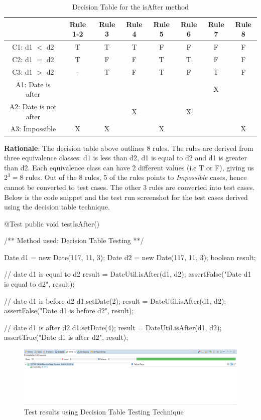 \documentclass[fontsize=12pt,paper=letter,twoside]{scrartcl}
\begin{document}
\begin{table}[h]
\centering
\begin{tabular}{|c | c | c | c | c | c | c | c |}
	\cline{1-8}
	& \textbf{Rule 1-2} & \textbf{Rule 3} & \textbf{Rule 4} & \textbf{Rule 5} & \textbf{Rule 6} & \textbf{Rule 7} & \textbf{Rule 8}\\ \hline
	C1: d1 $<$ d2 & T & T & T & F & F & F & F \\ \hline
	C2: d1 $=$ d2 & T & F & F & T & T & F & F \\ \hline
	C3: d1 $>$ d2 & - & T & F & T & F & T & F \\ \Xhline{2pt}
	A1: Date is after & & & & & & X & \\ \hline
	A2: Date is not after & & & X & & X & & \\ \hline
	A3: Impossible & X & X & & X & & & X \\ \hline
\end{tabular}
\caption {Decision Table for the isAfter method}
\label{tbl:trace_matrix}
\end{table}

\noindent \textbf{Rationale}: The decision table above outlines 8 rules. The rules are derived from three equivalence classes: d1 is less than d2, d1 is equal to d2 and d1 is greater than d2. Each equivalence class can have 2 different values (i.e T or F), giving us $2^3 = 8$ rules. Out of the 8 rules, 5 of the rules points to \emph{Impossible} cases, hence cannot be converted to test cases. The other 3 rules are converted into test cases. Below is the code snippet and the test run screenshot for the test cases derived using the decision table technique.

\newpage
\begin{code}
	@Test
	public void testIsAfter() {
		/** Method used: Decision Table Testing **/
		
		Date d1 = new Date(117, 11, 3);
		Date d2 = new Date(117, 11, 3);
		boolean result;
		
		// date d1 is equal to d2
		result = DateUtil.isAfter(d1, d2);
		assertFalse("Date d1 is equal to d2", result);
		
		// date d1 is before d2
		d1.setDate(2);
		result = DateUtil.isAfter(d1, d2);
		assertFalse("Date d1 is before d2", result);
		
		// date d1 is after d2
		d1.setDate(4);
		result = DateUtil.isAfter(d1, d2);
		assertTrue("Date d1 is after d2", result);
	}
\end{code}

\begin{figure}[!htb]
\begin{center}
\includegraphics[width=.99\textwidth]{images/bbt/dtt.png}
\end{center}
\caption{Test results using Decision Table Testing Technique}
\label{fig:bbt_dtt}
\end{figure}
\end{document}
